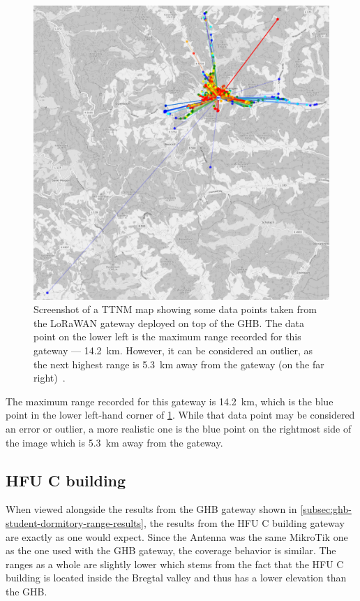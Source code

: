 \begin{figure}[htbp]
    \centering
    \includegraphics[width=1\textwidth]{pictures/ttn-mapper/gateway-ranges/ghb_mikrotik_gw_range.png}
    \caption{
        Screenshot of a \ac{TTNM} map showing some data points taken from the \ac{LoRaWAN} gateway deployed on top of the \ac{GHB}.
        The data point on the lower left is the maximum range recorded for this gateway --- \SI{14.2}{\kilo\meter}.
        However, it can be considered an outlier, as the next highest range is \SI{5.3}{\kilo\meter} away from the gateway (on the far right)~\cite{ttn_mapper_ttn_2023}.
    }\label{pic:ghb_mikrotik_gw_range}
\end{figure}

The maximum range recorded for this gateway is \SI{14.2}{\kilo\meter}, which is the blue point in the lower left-hand corner of \cref{pic:ghb_mikrotik_gw_range}.
While that data point may be considered an error or outlier, a more realistic one is the blue point on the rightmost side of the image which is \SI{5.3}{\kilo\meter} away from the gateway.

\subsection{\acs{HFU} C building}

When viewed alongside the results from the \ac{GHB} gateway shown in \cref{subsec:ghb-student-dormitory-range-results}, the results from the \ac{HFU} C building gateway are exactly as one would expect.
Since the Antenna was the same MikroTik one as the one used with the \ac{GHB} gateway, the coverage behavior is similar.
The ranges as a whole are slightly lower which stems from the fact that the \ac{HFU} C building is located inside the Bregtal valley and thus has a lower elevation than the \ac{GHB}.

